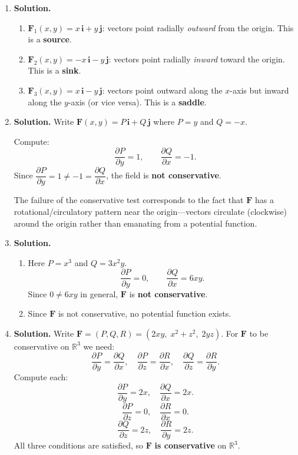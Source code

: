 \begin{enumerate}
\textbf{Disadvantage:} All information about the \emph{magnitude} is lost. For example, in a wind field, one cannot distinguish regions of high wind speed from regions of low wind speed.

\item \textbf{Solution.}
\begin{enumerate}
\item $\mathbf{F}_1(x,y) = x\,\mathbf{i} + y\,\mathbf{j}$: vectors point radially \emph{outward} from the origin. This is a \textbf{source}.

\item $\mathbf{F}_2(x,y) = -x\,\mathbf{i} - y\,\mathbf{j}$: vectors point radially \emph{inward} toward the origin. This is a \textbf{sink}.

\item $\mathbf{F}_3(x,y) = x\,\mathbf{i} - y\,\mathbf{j}$: vectors point outward along the $x$-axis but inward along the $y$-axis (or vice versa). This is a \textbf{saddle}.
\end{enumerate}

\item \textbf{Solution.}
Write $\mathbf{F}(x,y) = P\,\mathbf{i} + Q\,\mathbf{j}$ where $P = y$ and $Q = -x$.

Compute:
\[
\frac{\partial P}{\partial y} = 1, \qquad \frac{\partial Q}{\partial x} = -1.
\]
Since $\dfrac{\partial P}{\partial y} = 1 \neq -1 = \dfrac{\partial Q}{\partial x}$, the field is \textbf{not conservative}.

The failure of the conservative test corresponds to the fact that $\mathbf{F}$ has a rotational/circulatory pattern near the origin---vectors circulate (clockwise) around the origin rather than emanating from a potential function.

\item \textbf{Solution.}
\begin{enumerate}
\item Here $P = x^3$ and $Q = 3x^2y$.
\[
\frac{\partial P}{\partial y} = 0, \qquad \frac{\partial Q}{\partial x} = 6xy.
\]
Since $0 \neq 6xy$ in general, $\mathbf{F}$ is \textbf{not conservative}.

\item Since $\mathbf{F}$ is not conservative, no potential function exists.
\end{enumerate}

\item \textbf{Solution.}
Write $\mathbf{F} = (P,Q,R) = (2xy,\; x^2+z^2,\; 2yz)$. For $\mathbf{F}$ to be conservative on $\mathbb{R}^3$ we need:
\[
\frac{\partial P}{\partial y} = \frac{\partial Q}{\partial x}, \quad \frac{\partial P}{\partial z} = \frac{\partial R}{\partial x}, \quad \frac{\partial Q}{\partial z} = \frac{\partial R}{\partial y}.
\]
Compute each:
\[
\frac{\partial P}{\partial y} = 2x, \quad \frac{\partial Q}{\partial x} = 2x.
\]
\[
\frac{\partial P}{\partial z} = 0, \quad \frac{\partial R}{\partial x} = 0.
\]
\[
\frac{\partial Q}{\partial z} = 2z, \quad \frac{\partial R}{\partial y} = 2z.
\]
All three conditions are satisfied, so $\mathbf{F}$ \textbf{is conservative} on $\mathbb{R}^3$.


\end{enumerate}
